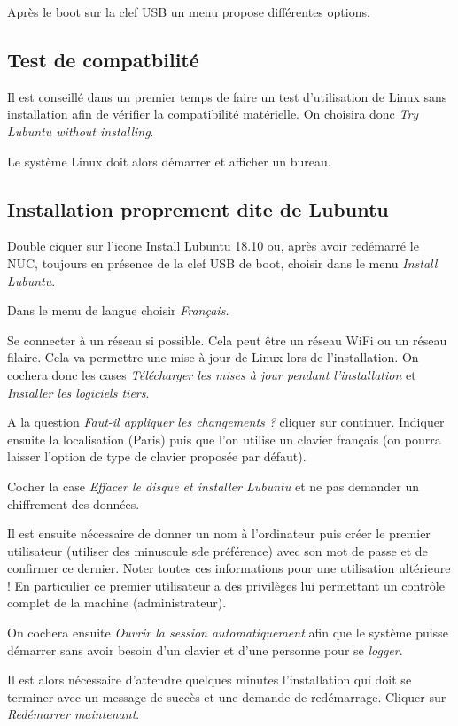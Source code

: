\documentclass[a4paper]{ffco-rapport}
\begin{document}
Après le boot sur la clef USB un menu propose différentes options.

\subsection{Test de compatbilité}
Il est conseillé dans un premier temps de faire un test d'utilisation de Linux sans installation afin de vérifier la compatibilité matérielle. On choisira donc \emph{Try Lubuntu without installing}.

Le système Linux doit alors démarrer et afficher un bureau.

\subsection{Installation proprement dite de Lubuntu}
Double ciquer sur l'icone \og{}Install Lubuntu 18.10\fg{} ou, après avoir redémarré le NUC, toujours en présence de la clef USB de boot, choisir dans le menu \emph{Install Lubuntu}.

Dans le menu de langue choisir \emph{Français}.

Se connecter à un réseau si possible. Cela peut être un réseau WiFi ou un réseau filaire. Cela va permettre une mise à jour de Linux lors de l'installation. On cochera donc les cases \emph{Télécharger les mises à jour pendant l'installation} et \emph{Installer les logiciels tiers}.

A la question \emph{Faut-il appliquer les changements ?} cliquer sur \og{}continuer\fg{}. Indiquer ensuite la localisation (Paris) puis que l'on utilise un clavier français (on pourra laisser l'option de type de clavier proposée par défaut).

Cocher la case \emph{Effacer le disque et installer Lubuntu} et ne pas demander un chiffrement des données.

Il est ensuite nécessaire de donner un nom à l'ordinateur puis créer le premier utilisateur (utiliser des minuscule sde préférence) avec son mot de passe et de confirmer ce dernier. Noter toutes ces informations pour une utilisation ultérieure ! En particulier ce premier utilisateur a des privilèges lui permettant un contrôle complet de la machine (administrateur).

On cochera ensuite \emph{Ouvrir la session automatiquement} afin que le système puisse démarrer sans avoir besoin d'un clavier et d'une personne pour se \emph{logger}.

Il est alors nécessaire d'attendre quelques minutes l'installation qui doit se terminer avec un message de succès et une demande de redémarrage. Cliquer sur \emph{Redémarrer maintenant}.
\end{document}
